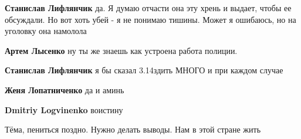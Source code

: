 \begin{itemize}
\begin{itemize}
\textbf{Станислав Лифлянчик} да. Я думаю отчасти она эту хрень и выдает, чтобы ее обсуждали. Но вот хоть убей - я не понимаю тишины. Может я ошибаюсь, но на уголовку она намолола

 
\textbf{Артем Лысенко} ну ты же знаешь как устроена работа полиции.

 
\textbf{Станислав Лифлянчик} я бы сказал 3.14здить МНОГО и при каждом случае

 
\textbf{Женя Лопатниченко} да и аминь

 
\textbf{Dmitriy Logvinenko} воистину
\end{itemize}

 
Тёма, пениться поздно. Нужно делать выводы. Нам в этой стране жить

\begin{itemize}
 

\end{itemize}
\end{itemize}
